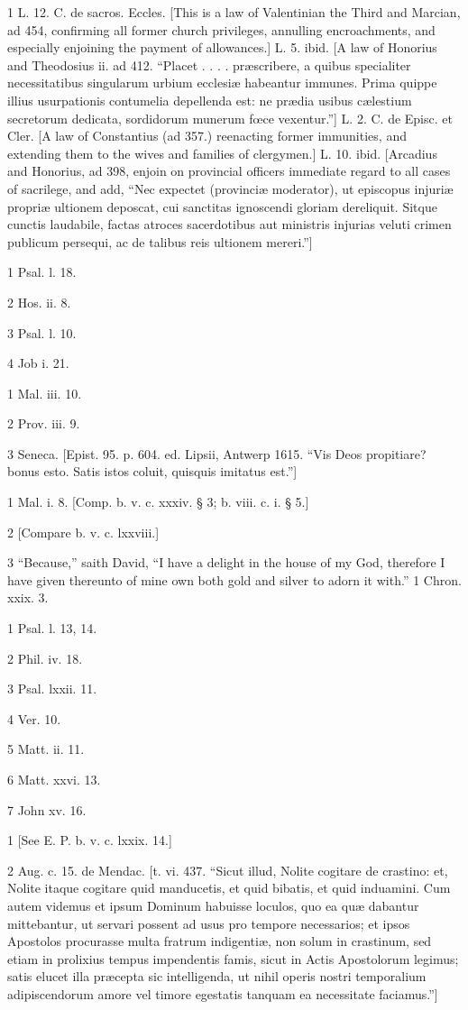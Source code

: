 1
L. 12. C. de sacros. Eccles. [This is a law of Valentinian the Third and Marcian, ad 454, confirming all former church privileges, annulling encroachments, and especially enjoining the payment of allowances.] L. 5. ibid. [A law of Honorius and Theodosius ii. ad 412. “Placet . . . . præscribere, a quibus specialiter necessitatibus singularum urbium ecclesiæ habeantur immunes. Prima quippe illius usurpationis contumelia depellenda est: ne prædia usibus cælestium secretorum dedicata, sordidorum munerum fœce vexentur.”] L. 2. C. de Episc. et Cler. [A law of Constantius (ad 357.) reenacting former immunities, and extending them to the wives and families of clergymen.] L. 10. ibid. [Arcadius and Honorius, ad 398, enjoin on provincial officers immediate regard to all cases of sacrilege, and add, “Nec expectet (provinciæ moderator), ut episcopus injuriæ propriæ ultionem deposcat, cui sanctitas ignoscendi gloriam dereliquit. Sitque cunctis laudabile, factas atroces sacerdotibus aut ministris injurias veluti crimen publicum persequi, ac de talibus reis ultionem mereri.”]

1
Psal. l. 18.

2
Hos. ii. 8.

3
Psal. l. 10.

4
Job i. 21.

1
Mal. iii. 10.

2
Prov. iii. 9.

3
Seneca. [Epist. 95. p. 604. ed. Lipsii, Antwerp 1615. “Vis Deos propitiare? bonus esto. Satis istos coluit, quisquis imitatus est.”]

1
Mal. i. 8. [Comp. b. v. c. xxxiv. § 3; b. viii. c. i. § 5.]

2
[Compare b. v. c. lxxviii.]

3
“Because,” saith David, “I have a delight in the house of my God, therefore I have given thereunto of mine own both gold and silver to adorn it with.” 1 Chron. xxix. 3.

1
Psal. l. 13, 14.

2
Phil. iv. 18.

3
Psal. lxxii. 11.

4
Ver. 10.

5
Matt. ii. 11.

6
Matt. xxvi. 13.

7
John xv. 16.

1
[See E. P. b. v. c. lxxix. 14.]

2
Aug. c. 15. de Mendac. [t. vi. 437. “Sicut illud, Nolite cogitare de crastino: et, Nolite itaque cogitare quid manducetis, et quid bibatis, et quid induamini. Cum autem videmus et ipsum Dominum habuisse loculos, quo ea quæ dabantur mittebantur, ut servari possent ad usus pro tempore necessarios; et ipsos Apostolos procurasse multa fratrum indigentiæ, non solum in crastinum, sed etiam in prolixius tempus impendentis famis, sicut in Actis Apostolorum legimus; satis elucet illa præcepta sic intelligenda, ut nihil operis nostri temporalium adipiscendorum amore vel timore egestatis tanquam ea necessitate faciamus.”]

